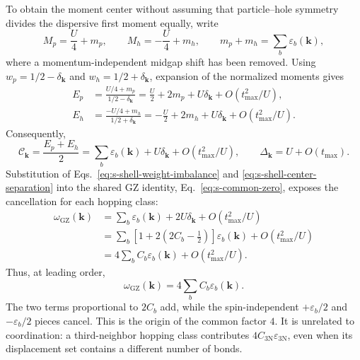 \documentclass[10pt]{article}
\newcommand{\wzero}{\omega_{\mathrm{GZ}}}
\newcommand{\dk}{\delta_{\mathbf{k}}}
\newcommand{\centermom}{\mathcal C_{\mathbf{k}}}
\newcommand{\sep}{\Delta_{\mathbf{k}}}
\begin{document}
To obtain the moment center without assuming that particle--hole symmetry
divides the dispersive first moment equally, write
\begin{equation}
 M_p=\frac U4+m_p,\qquad M_h=-\frac U4+m_h,
 \qquad m_p+m_h=\sum_b\varepsilon_b(\mathbf k),
\label{eq:s-shell-weighted-moments}
\end{equation}
where a momentum-independent midgap shift has been removed. Using
$w_p=1/2-\dk$ and $w_h=1/2+\dk$, expansion of the normalized moments gives
\begin{align}
 E_p&=\frac{U/4+m_p}{1/2-\dk}
     =\frac U2+2m_p+U\dk+O(t_{\max}^2/U),\nonumber\\
 E_h&=\frac{-U/4+m_h}{1/2+\dk}
     =-\frac U2+2m_h+U\dk+O(t_{\max}^2/U).
\label{eq:s-shell-normalized-moments}
\end{align}
Consequently,
\begin{equation}
 \centermom=\frac{E_p+E_h}{2}
 =\sum_b\varepsilon_b(\mathbf k)+U\dk+O(t_{\max}^2/U),
 \qquad \sep=U+O(t_{\max}).
\label{eq:s-shell-center-separation}
\end{equation}
Substitution of Eqs.~\ref{eq:s-shell-weight-imbalance} and
\ref{eq:s-shell-center-separation} into the shared GZ identity,
Eq.~\ref{eq:s-common-zero}, exposes the cancellation for each hopping class:
\begin{align}
 \wzero(\mathbf k)
 &=\sum_b\varepsilon_b(\mathbf k)+2U\dk
   +O(t_{\max}^2/U)\nonumber\\
 &=\sum_b\left[1+2\left(2C_b-\frac12\right)\right]
   \varepsilon_b(\mathbf k)+O(t_{\max}^2/U)\nonumber\\
 &=4\sum_b C_b\varepsilon_b(\mathbf k)+O(t_{\max}^2/U).
\label{eq:s-hopping-channel-result}
\end{align}
Thus, at leading order,
\begin{equation}
 \boxed{\wzero(\mathbf k)=4\sum_b C_b\varepsilon_b(\mathbf k)}.
\label{eq:s-hopping-channel-boxed}
\end{equation}
The two terms proportional to $2C_b$ add, while the spin-independent
$+\varepsilon_b/2$ and $-\varepsilon_b/2$ pieces cancel. This is the origin
of the common factor $4$. It is unrelated to coordination: a third-neighbor
hopping class contributes $4C_{\mathrm{3N}}\varepsilon_{\mathrm{3N}}$, even when
its displacement set contains a different number of bonds.
\end{document}
